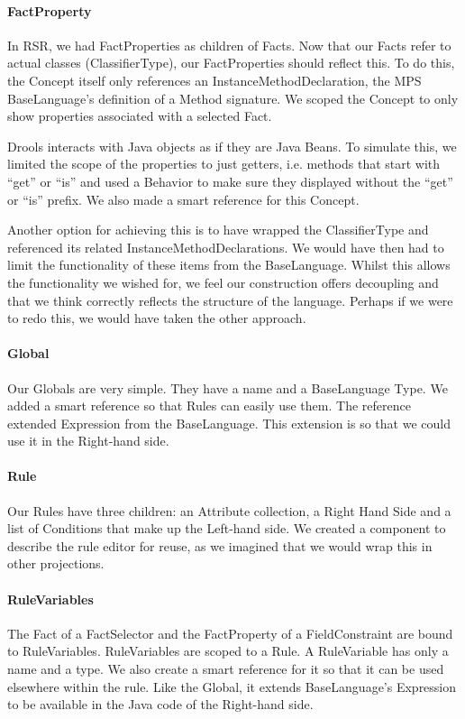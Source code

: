\paragraph{FactProperty} In RSR, we had FactProperties as children of Facts.
Now that our Facts refer to actual classes (ClassifierType), our FactProperties should reflect this.
To do this, the Concept itself only references an InstanceMethodDeclaration, the MPS BaseLanguage's definition of a Method signature.
We scoped the Concept to only show properties associated with a selected Fact.

Drools interacts with Java objects as if they are Java Beans.
To simulate this, we limited the scope of the properties to just getters, i.e. methods that start with ``get'' or ``is'' and used a Behavior to make sure they displayed without the ``get'' or ``is'' prefix.
We also made a smart reference for this Concept.

Another option for achieving this is to have wrapped the ClassifierType and referenced its related InstanceMethodDeclarations.
We would have then had to limit the functionality of these items from the BaseLanguage.
Whilst this allows the functionality we wished for, we feel our construction offers decoupling and that we think correctly reflects the structure of the language.
Perhaps if we were to redo this, we would have taken the other approach.

\paragraph{Global} Our Globals are very simple.
They have a name and a BaseLanguage Type.
We added a smart reference so that Rules can easily use them.
The reference extended Expression from the BaseLanguage.
This extension is so that we could use it in the Right-hand side.

\paragraph{Rule} Our Rules have three children: an Attribute collection, a Right Hand Side and a list of Conditions that make up the Left-hand side.
We created a component to describe the rule editor for reuse, as we imagined that we would wrap this in other projections.

\paragraph{RuleVariables} The Fact of a FactSelector and the FactProperty of a FieldConstraint are bound to RuleVariables.
RuleVariables are scoped to a Rule.
A RuleVariable has only a name and a type.
We also create a smart reference for it so that it can be used elsewhere within the rule.
Like the Global, it extends BaseLanguage's Expression to be available in the Java code of the Right-hand side.

